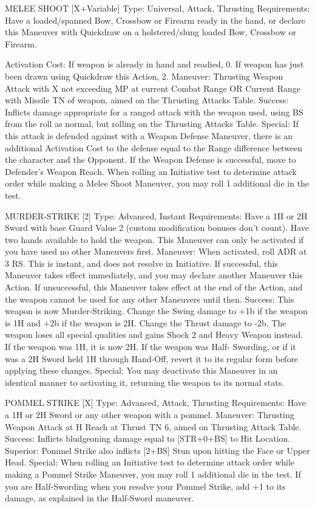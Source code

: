 \documentclass[oneside,11pt,english]{book}
\begin{document}
MELEE SHOOT [X+Variable] 
Type: Universal, Attack, Thrusting 
Requirements: Have a loaded/spanned Bow, Crossbow or Firearm ready in the hand, or declare this 
Maneuver with Quickdraw on a holstered/slung loaded Bow, Crossbow or Firearm. 


Activation Cost: If weapon is already in hand and readied, 0. If weapon has just been drawn using 
Quickdraw this Action, 2. 
Maneuver: Thrusting Weapon Attack with X not exceeding MP at current Combat Range OR Current 
Range with Missile TN of weapon, aimed on the Thrusting Attacks Table. 
Success: Inflicts damage appropriate for a ranged attack with the weapon used, using BS from the roll as 
normal, but rolling on the Thrusting Attacks Table. 
Special: If this attack is defended against with a Weapon Defense Maneuver, there is an additional 
Activation Cost to the defense equal to the Range difference between the character and the Opponent. If 
the Weapon Defense is successful, move to Defender’s Weapon Reach. 
When rolling an Initiative test to determine attack order while making a Melee Shoot Maneuver, you may 
roll 1 additional die in the test. 

 

MURDER-STRIKE [2] 
Type: Advanced, Instant 
Requirements: Have a 1H or 2H Sword with base Guard Value 2 (custom modification bonuses don’t 
count). Have two hands available to hold the weapon. This Maneuver can only be activated if you have 
used no other Maneuvers first. 
Maneuver: When activated, roll ADR at 3 RS. This is instant, and does not resolve in Initiative. If 
successful, this Maneuver takes effect immediately, and you may declare another Maneuver this Action. 
If unsuccessful, this Maneuver takes effect at the end of the Action, and the weapon cannot be used for 
any other Maneuvers until then. 
Success: This weapon is now Murder-Striking. Change the Swing damage to +1b if the weapon is 1H and 
+2b if the weapon is 2H. Change the Thrust damage to -2b. The weapon loses all special qualities and 
gains Shock 2 and Heavy Weapon instead. If the weapon was 1H, it is now 2H. If the weapon was Half-
Swording, or if it was a 2H Sword held 1H through Hand-Off, revert it to its regular form before applying 
these changes. 
Special: You may deactivate this Maneuver in an identical manner to activating it, returning the weapon 
to its normal stats. 

 

POMMEL STRIKE [X] 
Type: Advanced, Attack, Thrusting 
Requirements: Have a 1H or 2H Sword or any other weapon with a pommel. 
Maneuver: Thrusting Weapon Attack at H Reach at Thrust TN 6, aimed on Thrusting Attack Table. 
Success: Inflicts bludgeoning damage equal to [STR+0+BS] to Hit Location. 
Superior: Pommel Strike also inflicts [2+BS] Stun upon hitting the Face or Upper Head. 
Special: When rolling an Initiative test to determine attack order while making a Pommel Strike 
Maneuver, you may roll 1 additional die in the test. If you are Half-Swording when you resolve your 
Pommel Strike, add +1 to its damage, as explained in the Half-Sword maneuver. 
\end{document}
